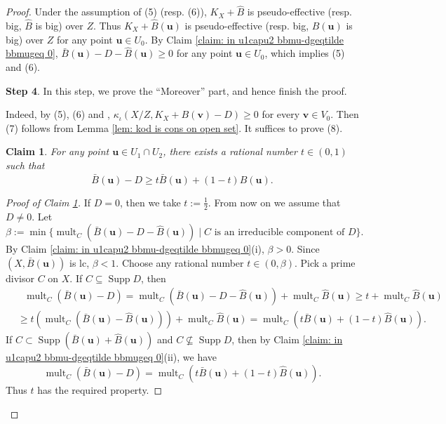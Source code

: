 \documentclass[11pt]{amsart}
\numberwithin{equation}{section}
\newcommand{\Supp}{\operatorname{Supp}}
\newcommand{\mult}{\operatorname{mult}}
\newtheorem{claim}[thm]{Claim}
\theoremstyle{definition}
\theoremstyle{definition}
\begin{document}
\begin{proof}
Under the assumption of (5) (resp. (6)), $K_X+\widehat B$ is pseudo-effective (resp. big, $\widehat B$ is big) over $Z$. Thus $K_X+\widehat B(\bm{u})$ is pseudo-effective (resp. big, $B(\bm{u})$ is big) over $Z$ for any point $\bm{u}\in U_0$. By Claim \ref{claim: in u1capu2 bbmu-dgeqtilde bbmugeq 0},  $\bar B(\bm{u})-D-\widehat B(\bm{u})\geq 0$ for any point $\bm{u}\in U_0$, which implies (5) and (6).

\medskip

\noindent\textbf{Step 4}. In this step, we prove the ``Moreover'' part, and hence finish the proof. 

Indeed, by (5), (6) and \cite[Theorem D]{BCHM10}, $\kappa_{\iota}(X/Z,K_X+B(\bm{v})-D)\geq 0$ for every $\bm{v}\in V_0$. Then (7) follows from Lemma \ref{lem: kod is cons on open set}. It suffices to prove (8). 
\begin{claim}\label{claim: barbu-d rational decomposition}
For any point $\bm{u}\in U_1\cap U_2$, there exists a rational number $t\in (0,1)$ such that
$$\bar B(\bm{u})-D\geq t\bar B(\bm{u})+(1-t)\widehat B(\bm{u}).$$
\end{claim}
\begin{proof}[Proof of Claim \ref{claim: barbu-d rational decomposition}]
If $D=0$, then we take $t:=\frac{1}{2}$. From now on we assume that $D\not=0$. Let
$$\beta:=\min\{\mult_C(\bar B(\bm{u})-D-\widehat B(\bm{u}))\mid C\text{ is an irreducible component of }D\}.$$
By Claim \ref{claim: in u1capu2 bbmu-dgeqtilde bbmugeq 0}(i), $\beta>0$. Since $(X,\bar B(\bm{u}))$ is lc, $\beta<1$. Choose any rational number $t\in (0,\beta)$. Pick a prime divisor $C$ on $X$. If $C\subseteq\Supp D$, then
\begin{align*}
    &\ \ \ \mult_C(\bar B(\bm{u})-D)=\mult_C(\bar B(\bm{u})-D-\widehat B(\bm{u}))+\mult_C\widehat B(\bm{u})\geq t+\mult_C\widehat B(\bm{u})
    \\&\geq t(\mult_C(\bar B(\bm{u})-\widehat B(\bm{u})))+\mult_C\widehat B(\bm{u})
    =\mult_C(t\bar B(\bm{u})+(1-t)\widehat B(\bm{u})).
\end{align*}
If $C\subset\Supp(\bar B(\bm{u})+\widehat B(\bm{u}))$ and $C\nsubseteq\Supp D$, then by Claim \ref{claim: in u1capu2 bbmu-dgeqtilde bbmugeq 0}(ii), we have
$$\mult_C(\bar B(\bm{u})-D)=\mult_C(t\bar B(\bm{u})+(1-t)\widehat B(\bm{u})).$$
Thus $t$ has the required property.
\end{proof}


\end{proof}
\end{document}
